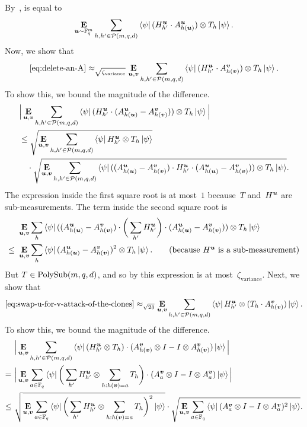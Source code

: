 By~,  is equal to
\begin{equation}\label{eq:delete-an-A}
\mathop{\bf E\/}_{\boldsymbol{u} \sim \mathbb F_q^m} \sum_{h, h' \in \mathcal{P}(m, q, d)} \bra{\psi} (H^{\boldsymbol{u}}_{h'} \cdot A^{\boldsymbol{u}}_{h(\boldsymbol{u})}) \otimes T_h \ket{\psi}.
\end{equation}
Now, we show that
\begin{equation}\label{eq:swap-u-for-v-attack-of-the-clones}
\eqref{eq:delete-an-A}
\approx_{\sqrt{\zeta_{\mathrm{variance}}}}
\mathop{\bf E\/}_{\boldsymbol{u}, \boldsymbol{v}} \sum_{h, h' \in \mathcal{P}(m, q, d)} \bra{\psi} (H^{\boldsymbol{u}}_{h'} \cdot A^{\boldsymbol{v}}_{h(\boldsymbol{v})}) \otimes T_h \ket{\psi}.
\end{equation}
To show this, we bound the magnitude of the difference.
\begin{align*}
&\Big|\mathop{\bf E\/}_{\boldsymbol{u}, \boldsymbol{v}} \sum_{h, h' \in \mathcal{P}(m, q, d)} \bra{\psi} (H^{\boldsymbol{u}}_{h'} \cdot (A^{\boldsymbol{u}}_{h(\boldsymbol{u})} - A^{\boldsymbol{v}}_{h(\boldsymbol{v})})) \otimes T_h \ket{\psi}\Big|\\
&\leq
\sqrt{\mathop{\bf E\/}_{\boldsymbol{u}, \boldsymbol{v}} \sum_{h, h' \in \mathcal{P}(m, q, d)} \bra{\psi} H^{\boldsymbol{u}}_{h'} \otimes T_h\ket{\psi}}\\
&\quad\cdot \sqrt{\mathop{\bf E\/}_{\boldsymbol{u}, \boldsymbol{v}} \sum_{h, h' \in \mathcal{P}(m, q, d)} \bra{\psi} ((A^{\boldsymbol{u}}_{h(\boldsymbol{u})} - A^{\boldsymbol{v}}_{h(\boldsymbol{v})}) \cdot H^{\boldsymbol{u}}_{h'} \cdot (A^{\boldsymbol{u}}_{h(\boldsymbol{u})} - A^{\boldsymbol{v}}_{h(\boldsymbol{v})})) \otimes T_h\ket{\psi}}.
\end{align*}
The expression inside the first square root is at most~$1$ because~$T$ and~$H^{\boldsymbol{u}}$ are sub-measurements.
The term inside the second square root is
\begin{align*}
&\E_{\bu, \bv} \sum_{h} \bra{\psi} ((A^{\bu}_{h(\bu)} - A^{\bv}_{h(\bv)}) \cdot \bigg( \sum_{h'} H^{\bu}_{h'}\bigg) \cdot (A^{\bu}_{h(\bu)} - A^{\bv}_{h(\bv)})) \otimes T_h \ket{\psi}\\
\leq~& \E_{\bu, \bv} \sum_{h} \bra{\psi}  (A^{\bu}_{h(\bu)} - A^{\bv}_{h(\bv)})^2 \otimes T_h\ket{\psi}.
\tag{because $H^{\bu}$ is a sub-measurement}
\end{align*}
But $T \in \mathrm{PolySub}(m, q, d)$, and so by  this expression is at most~$\zeta_{\mathrm{variance}}$.
Next, we show that
\begin{equation}\label{eq:move-over-v}
\eqref{eq:swap-u-for-v-attack-of-the-clones}
\approx_{\sqrt{2\delta}}
\mathop{\bf E\/}_{\boldsymbol{u}, \boldsymbol{v}} \sum_{h, h' \in \mathcal{P}(m, q, d)} \bra{\psi} H^{\boldsymbol{u}}_{h'}  \otimes (T_h \cdot A^{\boldsymbol{v}}_{h(\boldsymbol{v})}) \ket{\psi}.
\end{equation}
To show this, we bound the magnitude of the difference.
\begin{align*}
&\Big|\mathop{\bf E\/}_{\boldsymbol{u}, \boldsymbol{v}} \sum_{h, h' \in \mathcal{P}(m, q, d)} \bra{\psi}  (H^{\boldsymbol{u}}_{h'}\otimes T_h) \cdot (A^{\boldsymbol{v}}_{h(\boldsymbol{v})} \otimes I - I \otimes A^{\boldsymbol{v}}_{h(\boldsymbol{v})}) \ket{\psi}\Big|\\
=~&\Big|\mathop{\bf E\/}_{\boldsymbol{u}, \boldsymbol{v}} \sum_{a \in \mathbb F_q}  \bra{\psi}  \bigg( \sum_{h'}H^{\boldsymbol{u}}_{h'} \otimes \sum_{h:h(\boldsymbol{v}) = a} T_h \bigg) \cdot (A^{\boldsymbol{v}}_a \otimes I - I \otimes A^{\boldsymbol{v}}_a) \ket{\psi}\Big|\\
\leq~&
\sqrt{\mathop{\bf E\/}_{\boldsymbol{u}, \boldsymbol{v}} \sum_{a \in \mathbb F_q}  \bra{\psi}  \bigg( \sum_{h'}H^{\boldsymbol{u}}_{h'} \otimes \sum_{h:h(\boldsymbol{v}) = a} T_h\bigg)^2\ket{\psi}}
\cdot \sqrt{\mathop{\bf E\/}_{\boldsymbol{u}, \boldsymbol{v}} \sum_{a \in \mathbb F_q}  \bra{\psi}(A^{\boldsymbol{v}}_a \otimes I - I \otimes A^{\boldsymbol{v}}_a)^2 \ket{\psi}}.
\end{align*}
